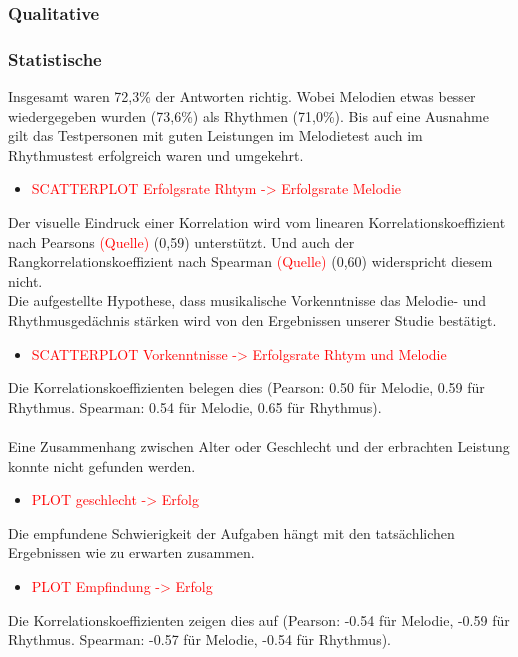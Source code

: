 \documentclass{acm_proc_article-sp}
\begin{document}
\subsubsection{Qualitative}
\subsubsection{Statistische}
Insgesamt waren 72,3\% der Antworten richtig. Wobei Melodien etwas besser wiedergegeben wurden (73,6\%) als Rhythmen (71,0\%). Bis auf eine Ausnahme gilt das Testpersonen mit guten Leistungen im Melodietest auch im Rhythmustest erfolgreich waren und umgekehrt.
\begin{itemize} 
\item \textcolor{red}{SCATTERPLOT Erfolgsrate Rhtym -> Erfolgsrate Melodie}
\end{itemize}
Der visuelle Eindruck einer Korrelation wird vom linearen Korrelationskoeffizient nach Pearsons \textcolor{red}{(Quelle)} (0,59) unterstützt. Und auch der Rangkorrelationskoeffizient nach Spearman \textcolor{red}{(Quelle)} (0,60) widerspricht diesem nicht.\\

Die aufgestellte Hypothese, dass musikalische Vorkenntnisse das Melodie- und Rhythmusgedächnis stärken wird von den Ergebnissen unserer Studie bestätigt.
\begin{itemize} 
\item \textcolor{red}{SCATTERPLOT Vorkenntnisse -> Erfolgsrate Rhtym und Melodie}
\end{itemize}
Die Korrelationskoeffizienten belegen dies (Pearson: 0.50 für Melodie, 0.59 für Rhythmus. Spearman: 0.54 für Melodie, 0.65 für Rhythmus).\\\\

Eine Zusammenhang zwischen Alter oder Geschlecht und der erbrachten Leistung konnte nicht gefunden werden.
\begin{itemize} 
\item \textcolor{red}{PLOT geschlecht -> Erfolg}
\end{itemize}

Die empfundene Schwierigkeit der Aufgaben hängt mit den tatsächlichen Ergebnissen wie zu erwarten zusammen.
\begin{itemize} 
\item \textcolor{red}{PLOT Empfindung -> Erfolg}
\end{itemize}
Die Korrelationskoeffizienten zeigen dies auf (Pearson: -0.54 für Melodie, -0.59 für Rhythmus. Spearman: -0.57 für Melodie, -0.54 für Rhythmus).
\end{document}

